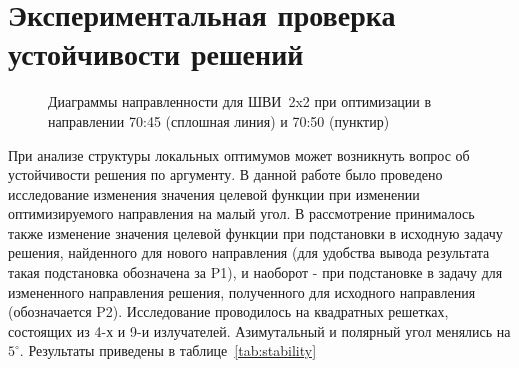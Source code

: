 \section{Экспериментальная проверка устойчивости решений}
\begin{figure}[h]
    \centering
    \vspace{0.7em}
    \caption{Диаграммы направленности для ШВИ~2x2 при оптимизации в направлении 70:45 (сплошная линия) и 70:50 (пунктир)}
    \label{ris:bve_comp}
\end{figure}
При анализе структуры локальных оптимумов может возникнуть вопрос об устойчивости решения по аргументу. В данной работе было проведено исследование изменения значения целевой функции при изменении оптимизируемого направления на малый угол. В рассмотрение принималось также изменение значения целевой функции при подстановки в исходную задачу решения, найденного для нового направления (для удобства вывода результата такая подстановка обозначена за P1), и наоборот - при подстановке в задачу для измененного направления решения, полученного для исходного направления (обозначается P2). Исследование проводилось на квадратных решетках, состоящих из 4-х и 9-и излучателей. Азимутальный и полярный угол менялись на $5^{\circ}$. Результаты приведены в таблице~\ref{tab:stability}
